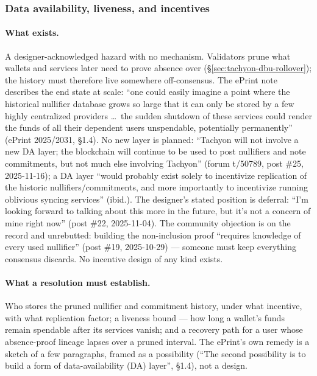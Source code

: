 \documentclass[11pt,a4paper]{article}
\theoremstyle{definition}
\begin{document}
\subsubsection{Data availability, liveness, and incentives}
\label{sec:tachyon-open-da}

\paragraph{What exists.} A designer-acknowledged hazard with no mechanism.
Validators prune what wallets and services later need to prove absence over
(\S\ref{sec:tachyon-dbu-rollover}); the history must therefore live
somewhere off-consensus. The ePrint note describes the end state at scale:
``one could easily imagine a point where the historical nullifier database
grows so large that it can only be stored by a few highly centralized
providers \ldots\ the sudden shutdown of these services could render the
funds of all their dependent users unspendable, potentially permanently''
(ePrint 2025/2031, \S1.4). No new layer is planned: ``Tachyon will not
involve a new DA layer; the blockchain will continue to be used to post
nullifiers and note commitments, but not much else involving Tachyon''
(forum t/50789, post \#25, 2025-11-16); a DA layer ``would probably exist
solely to incentivize replication of the historic nullifiers/commitments,
and more importantly to incentivize running oblivious syncing services''
(ibid.). The designer's stated position is deferral: ``I'm looking forward
to talking about this more in the future, but it's not a concern of mine
right now'' (post \#22, 2025-11-04). The community objection is on the
record and unrebutted: building the non-inclusion proof ``requires
knowledge of every used nullifier'' (post \#19, 2025-10-29) --- someone must
keep everything consensus discards. No incentive design of any kind exists.

\paragraph{What a resolution must establish.} Who stores the pruned
nullifier and commitment history, under what incentive, with what
replication factor; a liveness bound --- how long a wallet's funds remain
spendable after its services vanish; and a recovery path for a user whose
absence-proof lineage lapses over a pruned interval. The ePrint's own
remedy is a sketch of a few paragraphs, framed as a possibility (``The
second possibility is to build a form of data-availability (DA) layer'',
\S1.4), not a design.
\end{document}
